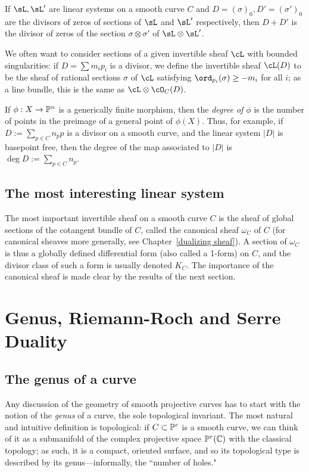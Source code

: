 If $\sL, \sL'$ are linear systems on a smooth curve $C$ and $D = (\sigma)_0,D' = (\sigma')_0$ are the divisors of zeros of sections of $\sL$ and $\sL'$ respectively, then $D+D'$ is the divisor of zeros of the section $\sigma\otimes \sigma'$ of
$\sL\otimes \sL'$.

We  often want to consider sections of a given invertible sheaf $\cL$ with bounded singularities: if $D = \sum m_ip_i$ is a divisor, we define the invertible sheaf $\cL(D)$ to be the sheaf of rational sections $\sigma$ of $\cL$ satisfying $\ord_{p_i}(\sigma) \geq -m_i$ for all $i$; as a line bundle, this is the same as $\cL \otimes \cO_C(D)$.

If $\phi:X \to \PP^n$ is a generically finite morphism, then the \emph{degree of $\phi$} is the number of points in the preimage of a general point of $\phi(X)$. Thus, for example, if $D := \sum_{p\in C} n_pp$ is a divisor on a smooth curve, and the linear system $|D|$ is basepoint free, then the degree of the map associated to $|D|$ is $\deg D := \sum_{p\in C} n_p$.

\subsection{The most interesting linear system}

The most important invertible sheaf on a smooth curve $C$ is the sheaf of global sections of the cotangent bundle of $C$, called the canonical sheaf $\omega_C$ of $C$ (for canonical sheaves more generally, see Chapter~\ref{dualizing sheaf}). A section of 
$\omega_C$ is thus a globally defined differential form (also called a 1-form) on $C$, and the divisor class
of such a form is usually denoted $K_C$. The importance of the canonical sheaf is made clear by the results of the next section.


\section{Genus, Riemann-Roch and Serre Duality}

\subsection{The genus of a curve}

Any discussion of the geometry of smooth projective curves has to start with the notion of the \emph{genus} of a curve, the sole topological invariant. The most natural and intuitive definition is topological: if $C \subset \PP^r$ is a smooth curve, we can think of it as a submanifold of the complex projective space $\PP^r(\CC)$ with the classical topology; as such, it is a compact, oriented surface, and so its topological type is described by its genus---informally, the ``number of holes."

